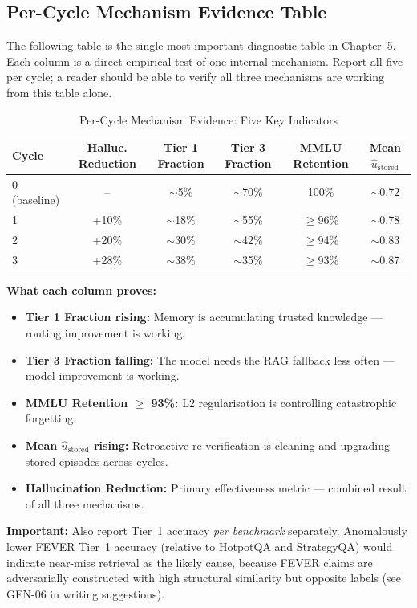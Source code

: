 \documentclass[12pt,a4paper]{article}
\theoremstyle{definition}
\begin{document}
\subsection{Per-Cycle Mechanism Evidence Table}
\label{sec:mechanism-evidence-table}

The following table is the single most important diagnostic table in Chapter~5. Each column is a direct empirical test of one internal mechanism. Report all five per cycle; a reader should be able to verify all three mechanisms are working from this table alone.

\begin{table}[htbp]
\centering
\caption{Per-Cycle Mechanism Evidence: Five Key Indicators}
\begin{tabular}{lccccc}
\toprule
\textbf{Cycle} & \textbf{Halluc. Reduction} & \textbf{Tier 1 Fraction} & \textbf{Tier 3 Fraction} & \textbf{MMLU Retention} & \textbf{Mean $\hat{u}_{\text{stored}}$} \\
\midrule
0 (baseline) & -- & $\sim$5\% & $\sim$70\% & 100\% & $\sim$0.72 \\
1 & +10\% & $\sim$18\% & $\sim$55\% & $\geq$96\% & $\sim$0.78 \\
2 & +20\% & $\sim$30\% & $\sim$42\% & $\geq$94\% & $\sim$0.83 \\
3 & +28\% & $\sim$38\% & $\sim$35\% & $\geq$93\% & $\sim$0.87 \\
\bottomrule
\end{tabular}
\end{table}

\begin{keyinsightbox}
\textbf{What each column proves:}
\begin{itemize}
    \item \textbf{Tier 1 Fraction rising:} Memory is accumulating trusted knowledge — routing improvement is working.
    \item \textbf{Tier 3 Fraction falling:} The model needs the RAG fallback less often — model improvement is working.
    \item \textbf{MMLU Retention $\geq$ 93\%:} L2 regularisation is controlling catastrophic forgetting.
    \item \textbf{Mean $\hat{u}_{\text{stored}}$ rising:} Retroactive re-verification is cleaning and upgrading stored episodes across cycles.
    \item \textbf{Hallucination Reduction:} Primary effectiveness metric — combined result of all three mechanisms.
\end{itemize}

\textbf{Important:} Also report Tier~1 accuracy \textit{per benchmark} separately. Anomalously lower FEVER Tier~1 accuracy (relative to HotpotQA and StrategyQA) would indicate near-miss retrieval as the likely cause, because FEVER claims are adversarially constructed with high structural similarity but opposite labels (see GEN-06 in writing suggestions).
\end{keyinsightbox}
\end{document}

